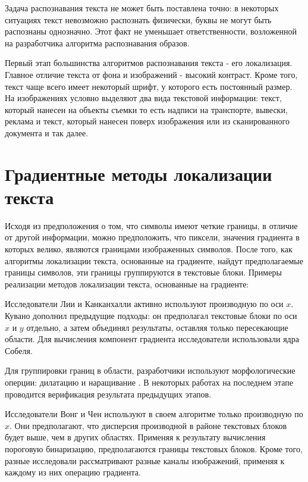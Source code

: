 \documentclass[oneside,final,14pt]{extreport}
\begin{document}
Задача распознавания текста не может быть поставлена точно: в некоторых ситуациях текст невозможно распознать физически, буквы не могут быть распознаны однозначно. Этот факт не уменьшает ответственности, возложенной на разработчика алгоритма распознавания образов.

Первый   этап большинства алгоритмов распознавания текста - его локализация. Главное отличие текста от фона и изображений - высокий контраст. Кроме того, текст чаще всего имеет некоторый шрифт, у которого есть постоянный размер. На изображениях  условно выделяют два вида текстовой информации: текст, который нанесен на объекты съемки то есть надписи на транспорте, вывески, реклама и текст, который нанесен поверх изображения или из сканированного документа и так далее. 

\section{Градиентные методы локализации текста}

Исходя из предположения о том, что символы имеют четкие границы, в отличие от другой информации, можно предположить, что пиксели, значения градиента в которых велико, являются границами изображенных символов. После того, как алгоритмы локализации текста, основанные на градиенте, найдут предполагаемые границы символов, эти границы группируются в текстовые блоки. Примеры реализации методов локализации текста, основанные на градиенте: 

Исследователи Лии и Канканхалли активно используют производную по оси $x$. Кувано дополнил предыдущие подходы: он предполагал текстовые блоки по оси $x$ и $y$ отдельно, а затем объединял результаты, оставляя только пересекающие области. Для вычисления компонент градиента исследователи использовали ядра Собеля. 

Для группировки границ в области, разработчики используют морфологические оперции: дилатацию и наращивание \cite{Dup:coursache}. В некоторых работах на последнем этапе проводится верификация результата предыдущих этапов.

Исследователи Вонг и Чен используют в своем алгоритме только производную по $x$. Они предполагают, что дисперсия производной в районе текстовых блоков будет выше, чем в других областях.  Применяя к результату вычисления пороговую бинаризацию, предполагаются границы текстовых блоков.  Кроме того, разные исследовали рассматривают разные каналы изображений, применяя к каждому из них операцию градиента.
\end{document}

